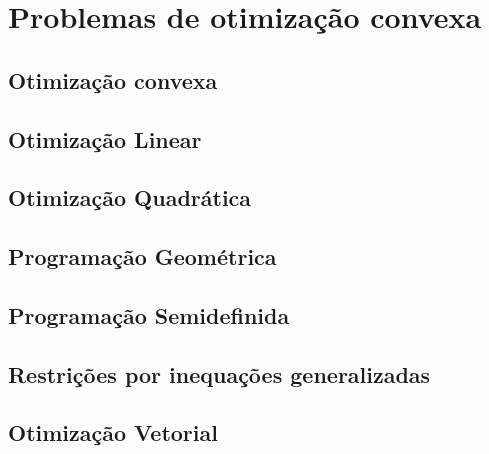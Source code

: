 \section{Problemas de otimização convexa}

\subsection{Otimização convexa}

\subsection{Otimização Linear}

\subsection{Otimização Quadrática}

\subsection{Programação Geométrica}

\subsection{Programação Semidefinida}

\subsection{Restrições por inequações generalizadas}

\subsection{Otimização Vetorial}


